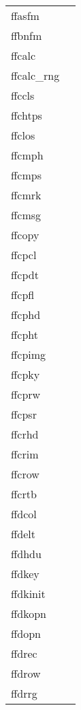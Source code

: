 \documentclass[11pt]{book}
\begin{document}
\newpage
\begin{tabular}{lr}
ffasfm    & \pageref{ffasfm} \\
ffbnfm   & \pageref{ffbnfm} \\
ffcalc     & \pageref{ffcalc} \\
ffcalc\_rng     & \pageref{ffcalcrng} \\
ffccls     & \pageref{ffccls} \\
ffchtps    & \pageref{ffchtps} \\
ffclos     & \pageref{ffclos} \\
ffcmph & \pageref{ffcmph} \\
ffcmps    & \pageref{ffcmps} \\
ffcmrk  & \pageref{ffpmrk} \\
ffcmsg  & \pageref{ffcmsg} \\
ffcopy     & \pageref{ffcopy} \\
ffcpcl     & \pageref{ffcpcl} \\
ffcpdt      & \pageref{ffcpdt} \\
ffcpfl      & \pageref{ffcpfl} \\
ffcphd   & \pageref{ffcphd} \\
ffcpht   & \pageref{ffcpht} \\
ffcpimg  & \pageref{ffcpimg} \\
ffcpky       & \pageref{ffcpky} \\
ffcprw      &   \pageref{ffcprw} \\
ffcpsr      &   \pageref{ffcpsr} \\
ffcrhd     & \pageref{ffcrhd} \\
ffcrim     & \pageref{ffcrim} \\
ffcrow    & \pageref{ffcrow} \\
ffcrtb     & \pageref{ffcrtb} \\
ffdcol   & \pageref{ffdcol} \\
ffdelt    & \pageref{ffdelt} \\
ffdhdu     & \pageref{ffdhdu} \\
ffdkey     & \pageref{ffdkey} \\
ffdkinit  & \pageref{ffinit} \\
ffdkopn      & \pageref{ffopen} \\
ffdopn      & \pageref{ffopen} \\
ffdrec  & \pageref{ffdrec} \\
ffdrow  & \pageref{ffdrow} \\
ffdrrg  & \pageref{ffdrrg} \\

\end{tabular}
\end{document}
